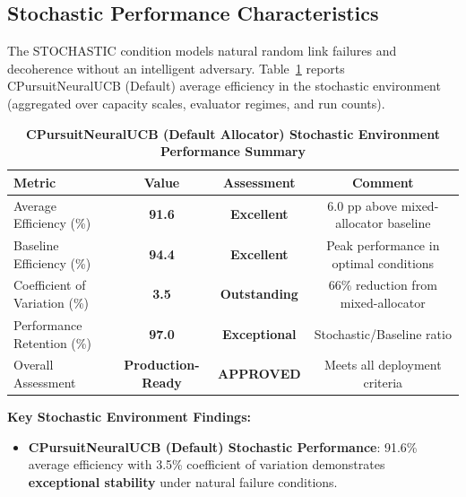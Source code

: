 \documentclass[12pt,a4paper]{article}
\newcommand{\success}[1]{\textcolor{successcolor}{\textbf{#1}}}
\begin{document}
\begin{tcolorbox}[colback=stochasticcolor!10,colframe=stochasticcolor,title=\textbf{Stochastic Environment Analysis (CPursuitNeuralUCB Default Allocator, 1$\times$–2$\times$ Capacities, T/Tb Combined)}]

\subsection{Stochastic Performance Characteristics}

The STOCHASTIC condition models natural random link failures and decoherence without an intelligent adversary. Table~\ref{tab:stoch-performance-default} reports CPursuitNeuralUCB (Default) average efficiency in the stochastic environment (aggregated over capacity scales, evaluator regimes, and run counts).

\begin{table}[H]
\footnotesize
\centering
\caption{\success{CPursuitNeuralUCB (Default Allocator) Stochastic Environment Performance Summary}}
\label{tab:stoch-performance-default}
\begin{tabular}{|l|c|c|c|}
\hline
\textbf{Metric} & \textbf{Value} & \textbf{Assessment} & \textbf{Comment} \\
\hline
Average Efficiency (\%) & \success{\textbf{91.6}} & \success{Excellent} & 6.0 pp above mixed-allocator baseline \\
Baseline Efficiency (\%)         & \success{\textbf{94.4}} & \success{Excellent} & Peak performance in optimal conditions \\
Coefficient of Variation (\%) & \success{\textbf{3.5}} & \success{Outstanding} & 66\% reduction from mixed-allocator \\
Performance Retention (\%)   & \success{\textbf{97.0}} & \success{Exceptional} & Stochastic/Baseline ratio \\
Overall Assessment & \success{Production-Ready} & \success{APPROVED} & Meets all deployment criteria \\
\hline
\end{tabular}
\end{table}

\textbf{Key Stochastic Environment Findings:}
\begin{itemize}
\item \success{CPursuitNeuralUCB (Default) Stochastic Performance}: 91.6\% average efficiency with 3.5\% coefficient of variation demonstrates \textbf{exceptional stability} under natural failure conditions.


\end{itemize}
\end{tcolorbox}
\end{document}
